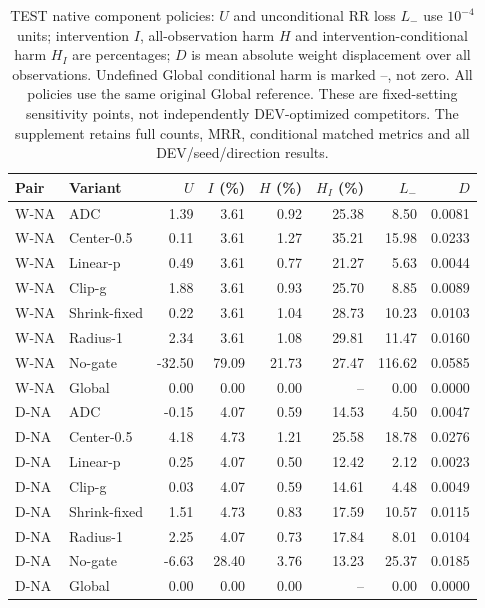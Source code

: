 \begin{table}[htbp]
\centering\footnotesize\setlength{\tabcolsep}{3pt}
\caption{TEST native component policies: $U$ and unconditional RR loss $L_-$ use $10^{-4}$ units; intervention $I$, all-observation harm $H$ and intervention-conditional harm $H_I$ are percentages; $D$ is mean absolute weight displacement over all observations. Undefined Global conditional harm is marked --, not zero. All policies use the same original Global reference. These are fixed-setting sensitivity points, not independently DEV-optimized competitors. The supplement retains full counts, MRR, conditional matched metrics and all DEV/seed/direction results.}
\label{tab:component-risk_additional}
\begin{tabular}{llrrrrrr}
\toprule
Pair & Variant & $U$ & $I$ (\%) & $H$ (\%) & $H_I$ (\%) & $L_-$ & $D$\\
\midrule
W-NA & ADC & 1.39 & 3.61 & 0.92 & 25.38 & 8.50 & 0.0081\\
W-NA & Center-0.5 & 0.11 & 3.61 & 1.27 & 35.21 & 15.98 & 0.0233\\
W-NA & Linear-p & 0.49 & 3.61 & 0.77 & 21.27 & 5.63 & 0.0044\\
W-NA & Clip-g & 1.88 & 3.61 & 0.93 & 25.70 & 8.85 & 0.0089\\
W-NA & Shrink-fixed & 0.22 & 3.61 & 1.04 & 28.73 & 10.23 & 0.0103\\
W-NA & Radius-1 & 2.34 & 3.61 & 1.08 & 29.81 & 11.47 & 0.0160\\
W-NA & No-gate & -32.50 & 79.09 & 21.73 & 27.47 & 116.62 & 0.0585\\
W-NA & Global & 0.00 & 0.00 & 0.00 & -- & 0.00 & 0.0000\\
D-NA & ADC & -0.15 & 4.07 & 0.59 & 14.53 & 4.50 & 0.0047\\
D-NA & Center-0.5 & 4.18 & 4.73 & 1.21 & 25.58 & 18.78 & 0.0276\\
D-NA & Linear-p & 0.25 & 4.07 & 0.50 & 12.42 & 2.12 & 0.0023\\
D-NA & Clip-g & 0.03 & 4.07 & 0.59 & 14.61 & 4.48 & 0.0049\\
D-NA & Shrink-fixed & 1.51 & 4.73 & 0.83 & 17.59 & 10.57 & 0.0115\\
D-NA & Radius-1 & 2.25 & 4.07 & 0.73 & 17.84 & 8.01 & 0.0104\\
D-NA & No-gate & -6.63 & 28.40 & 3.76 & 13.23 & 25.37 & 0.0185\\
D-NA & Global & 0.00 & 0.00 & 0.00 & -- & 0.00 & 0.0000\\
\bottomrule
\end{tabular}
\end{table}
